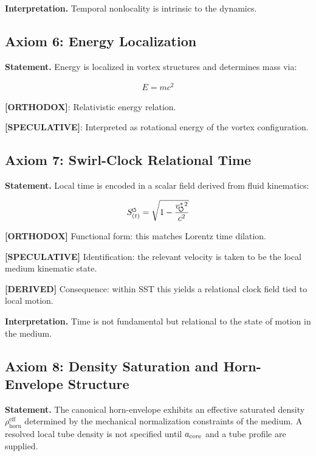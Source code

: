 \documentclass[11pt]{article}
\theoremstyle{definition}
\theoremstyle{plain}
\theoremstyle{remark}
\newcommand{\swirlarrow}{\mathchoice{\mkern-2mu\scriptstyle\boldsymbol{\circlearrowleft}}{\mkern-2mu\scriptstyle\boldsymbol{\circlearrowleft}}{\mkern-2mu\scriptscriptstyle\boldsymbol{\circlearrowleft}}{\mkern-2mu\scriptscriptstyle\boldsymbol{\circlearrowleft}}}
\newcommand{\rhohorn}{\rho_{\mathrm{horn}}^{\mathrm{eff}}}
\newcommand{\SwirlClock}{{S_{(t)}^{\swirlarrow}}}
\newcommand{\vchar}{v_{\!\boldsymbol{\circlearrowleft}}^{\ast}}
\begin{document}
        \textbf{Interpretation.}
        Temporal nonlocality is intrinsic to the dynamics.
    
    \subsection{Axiom 6: Energy Localization}
        
        \textbf{Statement.}
        Energy is localized in vortex structures and determines mass via:
        
        \begin{align}
            E = m c^2
        \end{align}
        
        \textbf{[ORTHODOX]}: Relativistic energy relation.
        
        \textbf{[SPECULATIVE]}: Interpreted as rotational energy of the vortex configuration.
    
    \subsection{Axiom 7: Swirl-Clock Relational Time}
        
        \textbf{Statement.}
        Local time is encoded in a scalar field derived from fluid kinematics:
        
        \begin{align}
            \SwirlClock = \sqrt{1 - \frac{\vchar{}^2}{c^2}}
        \end{align}
        
        \textbf{[ORTHODOX]} Functional form: this matches Lorentz time dilation.

        \textbf{[SPECULATIVE]} Identification: the relevant velocity is taken to be the local medium kinematic state.

        \textbf{[DERIVED]} Consequence: within SST this yields a relational clock field tied to local motion.
        
        \textbf{Interpretation.}
        Time is not fundamental but relational to the state of motion in the medium.
    
    \subsection{Axiom 8: Density Saturation and Horn-Envelope Structure}
        
        \textbf{Statement.}
        The canonical horn-envelope exhibits an effective saturated density
        \(\rhohorn\) determined by the mechanical normalization constraints of the
        medium. A resolved local tube density is not specified until
        \(a_{\rm core}\) and a tube profile are supplied.
        
\end{document}
